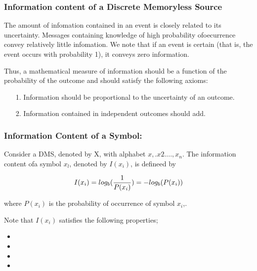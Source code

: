 \documentclass[a4]{beamer}
\begin{document}
\begin{frame}
\frametitle{ Information content of a Discrete Memoryless Source}
The amount of infomation contained in an event is closely related to its uncertainty.
Messages containing  knowledge of high probability ofoecurrence convey relatively little infomation. 
We note that if an event is certain (that is, the event occurs with probability 1), it conveys zero information.


Thus, a mathematical measure of information should be a function of the probability of the outcome and should satisfy the following axioms:
\begin{itemize}
\item[1.] Information should be proportional to the uncertainty of an outcome.
\item[2.] Information contained in independent outcomes should add.
\end{itemize}
\end{frame}

\begin{frame}
\frametitle{ Information Content of a Symbol:}

Consider a DMS, denoted by X, with alphabet ${x,.x2. ...,x_n}$. The information content ofa symbol
$x_l$, denoted by $I(x_i)$, is defineed by

\[  I(x_i)  = log_b({1 \over P(x_i)}) =  -log_b( P(x_i) ) \]


where $P(x_i)$ is the probability of occurrence of symbol $x_i$,.
\end{frame}


\begin{frame}
Note that $I(x_i)$ satisfies the following properties;
\begin{itemize}
\item %
\item %
\item %
\item %
\end{itemize}
\end{frame}
\end{document}
